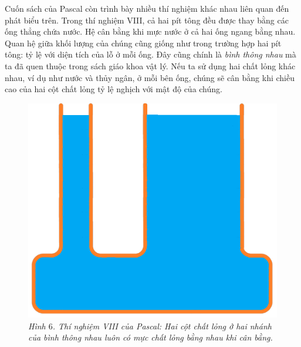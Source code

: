 \begin{multicols}{2}
	\vskip 0.2cm
	Cuốn sách của Pascal còn trình bày nhiều thí nghiệm khác nhau liên quan đến phát biểu trên. 
	\vskip 0.1cm
	Trong thí nghiệm VIII, cả hai pít tông đều được thay bằng các ống thẳng chứa nước. Hệ cân bằng khi mực nước ở cả hai ống ngang bằng nhau. Quan hệ giữa khối lượng của chúng cũng giống như trong trường hợp hai pít tông: tỷ lệ với diện tích của lỗ ở mỗi ống. Đây cũng chính là \textit{bình thông nhau} mà ta đã quen thuộc trong sách giáo khoa vật lý. Nếu ta sử dụng hai chất lỏng khác nhau, ví dụ như nước và thủy ngân, ở mỗi bên ống, chúng sẽ cân bằng khi chiều cao của hai cột chất lỏng tỷ lệ nghịch với mật độ của chúng.
	\begin{figure}[H]
		\vspace*{-5pt}
		\centering
		\captionsetup{labelformat= empty, justification=centering}
		\includegraphics[width= 1\linewidth]{8}
		\caption{\small\textit{\color{timhieukhoahoc}Hình $6$. Thí nghiệm VIII của Pascal: Hai cột chất lỏng ở hai nhánh của bình thông nhau luôn có mực chất lỏng bằng nhau khi cân bằng.}}
		\vspace*{-10pt}
	\end{figure}
	\begin{figure}[H]
		\vspace*{-5pt}
		\centering
		\captionsetup{labelformat= empty, justification=centering}

\end{figure}
\end{multicols}
